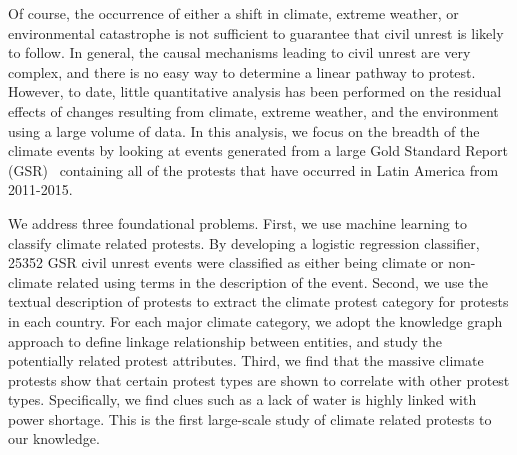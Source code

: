 \documentclass[9pt,twocolumn,twoside]{pnas-new}
\begin{document}
Of course, the occurrence of either a shift in climate, extreme weather, or environmental catastrophe is not sufficient to guarantee that civil unrest is likely to follow.
In general, the causal mechanisms leading to civil unrest are very complex, and there is no easy way to determine a linear pathway to protest.
However, to date, little quantitative analysis has been performed on the residual effects of changes resulting from climate, extreme weather, and the environment using a large volume of data. In this analysis, we focus on the breadth of the climate events by looking at events generated from a large Gold Standard Report (GSR)~\cite{ramakrishnan2014beating} containing all of the protests that have occurred in Latin America from 2011-2015.

We address three foundational problems. First, we use machine learning to classify climate related protests. By developing a logistic regression classifier, 25352 GSR civil unrest events were classified as either being climate or non-climate related using terms in the description of the event. Second, we use the textual description of protests to extract the climate protest category for protests in each country. For each major climate category, we adopt the knowledge graph approach to define linkage relationship between entities, and study the potentially related protest attributes. Third, we find that the massive climate protests show that certain protest types are shown to correlate with other protest types. Specifically, we find clues such as a lack of water is highly linked with power shortage. This is the first large-scale study of climate related protests to our knowledge.

%
%


%
\end{document}
